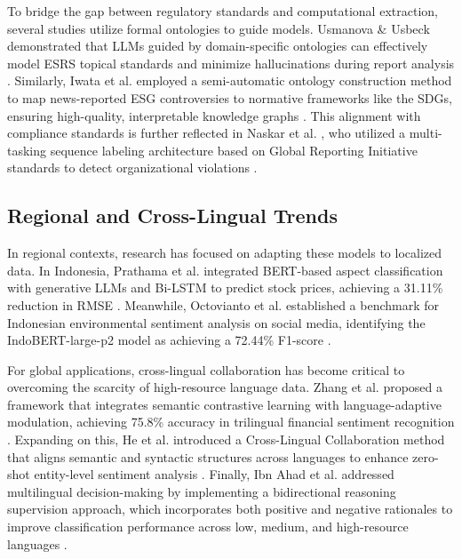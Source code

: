 To bridge the gap between regulatory standards and computational extraction, several studies utilize formal ontologies to guide models. Usmanova \& Usbeck  \parencite{aida_usmanova_e9b44e1d} demonstrated that LLMs guided by domain-specific ontologies can effectively model ESRS topical standards and minimize hallucinations during report analysis  \parencite{aida_usmanova_e9b44e1d}. Similarly, Iwata et al.  \parencite{tsuyoshi_iwata_18ccc0b8} employed a semi-automatic ontology construction method to map news-reported ESG controversies to normative frameworks like the SDGs, ensuring high-quality, interpretable knowledge graphs  \parencite{tsuyoshi_iwata_18ccc0b8}. This alignment with compliance standards is further reflected in Naskar et al.  \parencite{abir_naskar_17efeb7b}, who utilized a multi-tasking sequence labeling architecture based on Global Reporting Initiative standards to detect organizational violations  \parencite{abir_naskar_17efeb7b}.
\subsection{Regional and Cross-Lingual Trends}

In regional contexts, research has focused on adapting these models to localized data. In Indonesia, Prathama et al.  \parencite{ubaidillah_ariq_prathama_a1856e2f} integrated BERT-based aspect classification with generative LLMs and Bi-LSTM to predict stock prices, achieving a 31.11\% reduction in RMSE  \parencite{ubaidillah_ariq_prathama_a1856e2f}. Meanwhile, Octovianto et al.  \parencite{christofer_octovianto_487e90aa} established a benchmark for Indonesian environmental sentiment analysis on social media, identifying the IndoBERT-large-p2 model as achieving a 72.44\% F1-score  \parencite{christofer_octovianto_487e90aa}.

For global applications, cross-lingual collaboration has become critical to overcoming the scarcity of high-resource language data. Zhang et al.  \parencite{liman_zhang_ec332205} proposed a framework that integrates semantic contrastive learning with language-adaptive modulation, achieving 75.8\% accuracy in trilingual financial sentiment recognition  \parencite{liman_zhang_ec332205}. Expanding on this, He et al.  \parencite{association_for_computational_linguistics_2025_5a25f994} introduced a Cross-Lingual Collaboration method that aligns semantic and syntactic structures across languages to enhance zero-shot entity-level sentiment analysis  \parencite{association_for_computational_linguistics_2025_5a25f994}. Finally, Ibn Ahad et al.  \parencite{association_for_computational_linguistics_2025_1ba46dee} addressed multilingual decision-making by implementing a bidirectional reasoning supervision approach, which incorporates both positive and negative rationales to improve classification performance across low, medium, and high-resource languages  \parencite{association_for_computational_linguistics_2025_1ba46dee}.

